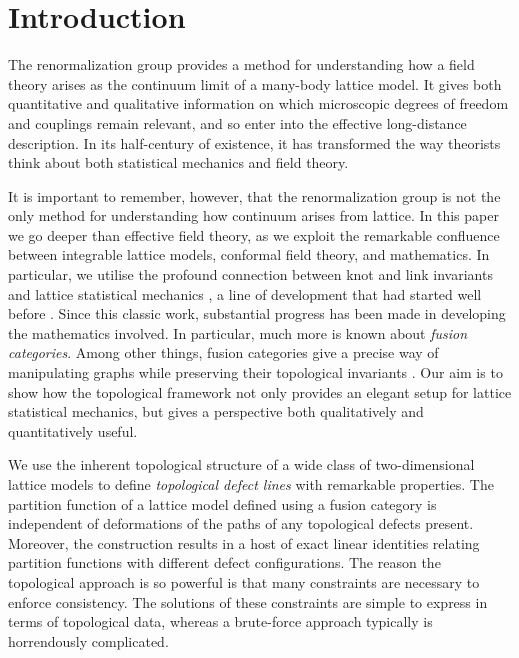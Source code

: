 
\section{Introduction}

The renormalization group provides a method for understanding how a field theory arises as the continuum limit of a many-body lattice model. It gives both quantitative and qualitative information on which microscopic degrees of freedom and couplings remain relevant, and so enter into the effective long-distance description. In its half-century of existence, it has transformed the way theorists think about both statistical mechanics and field theory.

It is important to remember, however, that the renormalization group is not the only method for understanding how continuum arises from lattice. In this paper we go deeper than effective field theory, as we exploit the remarkable confluence between integrable lattice models, conformal field theory, and mathematics. In particular, we utilise the profound connection between knot and link invariants \cite{Jones1987} and lattice statistical mechanics \cite{Jones1989,Wadati1989,Wu1992}, a line of development that had started well before \cite{Temperley1971,Fortuin1971,Baxter1976}. 
Since this classic work, substantial progress has been made in developing the mathematics involved. In particular, much more is known about {\em fusion categories}. Among other things, fusion categories give a precise way of manipulating graphs while preserving their topological invariants  \cite{MSReview89,barrett1999,kup_spider,blob_paper,jones_pa,Kitaev2006}. Our aim is to show how the topological framework not only provides an elegant setup for lattice statistical mechanics, but gives a perspective both qualitatively and quantitatively useful. 

We use the inherent topological structure of a wide class of two-dimensional lattice models to define {\em topological defect lines} with remarkable properties. The partition function of a lattice model defined using a fusion category is independent of deformations of the paths of any topological defects present. Moreover, the construction results in a host of exact linear identities relating partition functions with different defect configurations. The reason the topological approach is so powerful is that many constraints are necessary to enforce consistency. The solutions of these constraints are simple to express in terms of topological data, whereas a brute-force approach typically is horrendously complicated.  

